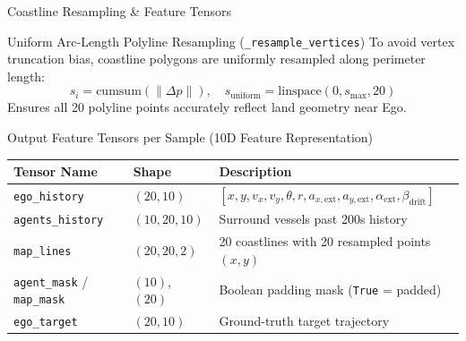 \documentclass[t]{beamer}
\begin{document}
\begin{frame}{Coastline Resampling \& Feature Tensors}
    \begin{block}{Uniform Arc-Length Polyline Resampling (\texttt{\_resample\_vertices})}
        To avoid vertex truncation bias, coastline polygons are uniformly resampled along perimeter length:
        $$s_i = \mathrm{cumsum}(\|\Delta p\|), \quad s_{\mathrm{uniform}} = \mathrm{linspace}(0, s_{\mathrm{max}}, 20)$$
        Ensures all 20 polyline points accurately reflect land geometry near Ego.
    \end{block}

    \begin{block}{Output Feature Tensors per Sample (10D Feature Representation)}
        \begin{table}
        \centering
        \footnotesize
        \begin{tabular}{lll}
        \toprule
        \textbf{Tensor Name} & \textbf{Shape} & \textbf{Description} \\
        \midrule
        \texttt{ego\_history} & $(20, 10)$ & $[x, y, v_x, v_y, \theta, r, a_{x,\mathrm{ext}}, a_{y,\mathrm{ext}}, \alpha_{\mathrm{ext}}, \beta_{\mathrm{drift}}]$ \\
        \texttt{agents\_history} & $(10, 20, 10)$ & Surround vessels past 200s history \\
        \texttt{map\_lines} & $(20, 20, 2)$ & 20 coastlines with 20 resampled points $(x,y)$ \\
        \texttt{agent\_mask} / \texttt{map\_mask} & $(10)$, $(20)$ & Boolean padding mask (\texttt{True} = padded) \\
        \texttt{ego\_target} & $(20, 10)$ & Ground-truth target trajectory \\
        \bottomrule
        \end{tabular}
        \end{table}
    \end{block}
\end{frame}
\end{document}
